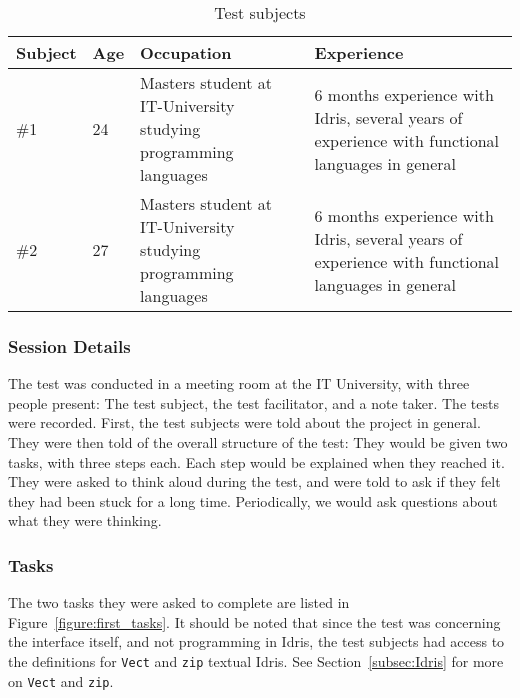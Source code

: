 \begin{table}[h]
\centering
\begin{tabular}{| l | l | p{5cm} | p{5cm} |}
\hline
Subject & Age & Occupation & Experience \\ \hline
\#1 & 24 & Masters student at IT-University studying programming languages & 6 months experience with Idris, several years of experience with functional languages in general \\ \hline
\#2 & 27 & Masters student at IT-University studying programming languages & 6 months experience with Idris, several years of experience with functional languages in general \\ \hline
\end{tabular}
\caption{Test subjects}
\label{table:first_test_subjects}
\end{table}

\subsubsection{Session Details}
The test was conducted in a meeting room at the IT University, with three
people present: The test subject, the test facilitator, and a note taker. The
tests were recorded. First, the test subjects were told about the project in
general. They were then told of the overall structure of the test: They would
be given two tasks, with three steps each. Each step would be explained when
they reached it. They were asked to think aloud during the test, and were told to
ask if they felt they had been stuck for a long time. Periodically, we would
ask questions about what they were thinking.

\subsubsection{Tasks}
The two tasks they were asked to complete are listed in Figure~\ref{figure:first_tasks}.
It should be noted that since the test was concerning the interface itself, and
not programming in Idris, the test subjects had access to the definitions for \texttt{Vect} and \texttt{zip} textual Idris. See Section~\ref{subsec:Idris}
for more on \texttt{Vect} and \texttt{zip}.

